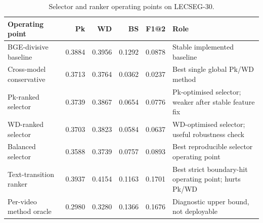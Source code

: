 \begin{table}[t]
\centering
\small
\caption{Selector and ranker operating points on LECSEG-30.}
\label{tab:selector_operating_points}
\begin{tabularx}{\linewidth}{lrrrrX}
\toprule
Operating point & Pk & WD & BS & F1@2 & Role \\
\midrule
BGE-divisive baseline & 0.3884 & 0.3956 & 0.1292 & 0.0878 & Stable implemented baseline \\
Cross-model conservative & 0.3713 & 0.3764 & 0.0362 & 0.0237 & Best single global Pk/WD method \\
Pk-ranked selector & 0.3739 & 0.3867 & 0.0654 & 0.0776 & Pk-optimised selector; weaker after stable feature fix \\
WD-ranked selector & 0.3703 & 0.3823 & 0.0584 & 0.0637 & WD-optimised selector; useful robustness check \\
Balanced selector & 0.3588 & 0.3739 & 0.0757 & 0.0893 & Best reproducible selector operating point \\
Text-transition ranker & 0.3937 & 0.4154 & 0.1163 & 0.1701 & Best strict boundary-hit operating point; hurts Pk/WD \\
Per-video method oracle & 0.2980 & 0.3280 & 0.1366 & 0.1676 & Diagnostic upper bound, not deployable \\
\bottomrule
\end{tabularx}
\end{table}